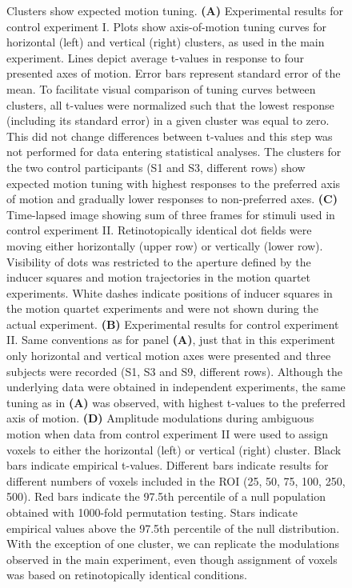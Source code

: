 \begin{figure}[ht!]
\ContinuedFloat
\captionsetup{labelformat=adja-page}
\caption{Clusters show expected motion tuning. \textbf{(A)} Experimental results for control experiment I. Plots show axis-of-motion tuning curves for horizontal (left) and vertical (right) clusters, as used in the main experiment. Lines depict average t-values in response to four presented axes of motion. Error bars represent standard error of the mean. To facilitate visual comparison of tuning curves between clusters, all t-values were normalized such that the lowest response (including its standard error) in a given cluster was equal to zero. This did not change differences between t-values and this step was not performed for data entering statistical analyses. The clusters for the two control participants (S1 and S3, different rows) show expected motion tuning with highest responses to the preferred axis of motion and gradually lower responses to non-preferred axes. \textbf{(C)} Time-lapsed image showing sum of three frames for stimuli used in control experiment II. Retinotopically identical dot fields were moving either horizontally (upper row) or vertically (lower row). Visibility of dots was restricted to the aperture defined by the inducer squares and motion trajectories in the motion quartet experiments. White dashes indicate positions of inducer squares in the motion quartet experiments and were not shown during the actual experiment. \textbf{(B)} Experimental results for control experiment II. Same conventions as for panel \textbf{(A)}, just that in this experiment only horizontal and vertical motion axes were presented and three subjects were recorded (S1, S3 and S9, different rows). Although the underlying data were obtained in independent experiments, the same tuning as in \textbf{(A)} was observed, with highest t-values to the preferred axis of motion. \textbf{(D)} Amplitude modulations during ambiguous motion when data from control experiment II were used to assign voxels to either the horizontal (left) or vertical (right) cluster. Black bars indicate empirical t-values. Different bars indicate results for different numbers of voxels included in the ROI (25, 50, 75, 100, 250, 500). Red bars indicate the 97.5th percentile of a null population obtained with 1000-fold permutation testing. Stars indicate empirical values above the 97.5th percentile of the null distribution. With the exception of one cluster, we can replicate the modulations observed in the main experiment, even though assignment of voxels was based on retinotopically identical conditions.}
\label{fig:figI_motionTng}
\noindent\hrulefill
\end{figure}

